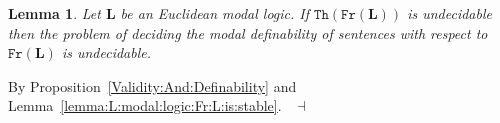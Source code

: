 \documentclass[draft]{article}
\newtheorem{lemma}{Lemma}
\newenvironment{proof}{{\bf Proof:}}{~$\dashv$\\}
\def\Th{\mathtt{Th}}
\def\Fr{\mathtt{Fr}}
\def\L{\mathbf{L}}
\begin{document}
%
%
\begin{lemma}\label{Lemma:53:bis}
%
%
Let $\L$ be an Euclidean modal logic.
If $\Th(\Fr(\L))$ is undecidable then the problem of deciding the modal definability of sentences with respect to $\Fr(\L)$ is undecidable.
%
%
\end{lemma}
%
%
\begin{proof}
%
%
By Proposition~\ref{Validity:And:Definability} and Lemma~\ref{lemma:L:modal:logic:Fr:L:is:stable}.
%
%
\medskip
%
%
\end{proof}
%
%
%
%
%
%
%
%
%
%
\end{document}

